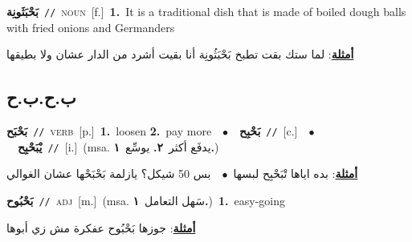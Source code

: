 \documentclass[10pt,a4paper,twoside]{article} %
\begin{document}
\begin{multicols}{2}
{\setlength\topsep{0pt}\textbf{\foreignlanguage{arabic}{بَحْبَثَونِة}}\ {\color{gray}\texttt{//}\color{black}}\ \textsc{noun}\ [f.]\ \textbf{1.}~It is a traditional dish that is made of boiled dough balls with fried onions and Germanders\  \begin{flushright}\color{gray}\foreignlanguage{arabic}{\textbf{\underline{\foreignlanguage{arabic}{أمثلة}}}: لما ستك بقت تطبخ بَحْبَثُونِة أنا بقيت أشرد من الدار عشان ولا بطيقها}\end{flushright}\color{black}} \vspace{2mm}

\vspace{-3mm}
\subsection*{\color{blue}\foreignlanguage{arabic}{ب.ح.ب.ح}\color{blue}{}} 

{\setlength\topsep{0pt}\textbf{\foreignlanguage{arabic}{بَحْبَح}}\ {\color{gray}\texttt{//}\color{black}}\ \textsc{verb}\ [p.]\ \textbf{1.}~loosen  \textbf{2.}~pay more\ \ $\bullet$\ \ \setlength\topsep{0pt}\textbf{\foreignlanguage{arabic}{بَحْبِح}}\ {\color{gray}\texttt{//}\color{black}}\ [c.]\ \ $\bullet$\ \ \setlength\topsep{0pt}\textbf{\foreignlanguage{arabic}{يْبَحْبِح}}\ {\color{gray}\texttt{//}\color{black}}\ [i.]\ \color{gray}(msa. \foreignlanguage{arabic}{يدفَع أكثر}~\foreignlanguage{arabic}{\textbf{٢.}}  \foreignlanguage{arabic}{يوسِّع}~\foreignlanguage{arabic}{\textbf{١.}})\color{black}\  \begin{flushright}\color{gray}\foreignlanguage{arabic}{\textbf{\underline{\foreignlanguage{arabic}{أمثلة}}}: بده اياها تْبَحْبِح لبسها\ $\bullet$\ \  بس 50 شيكل؟ يازلمة بَحْبَحْها عشان الغوالي}\end{flushright}\color{black}} \vspace{2mm}

{\setlength\topsep{0pt}\textbf{\foreignlanguage{arabic}{بَحْبُوح}}\ {\color{gray}\texttt{//}\color{black}}\ \textsc{adj}\ [m.]\ \color{gray}(msa. \foreignlanguage{arabic}{سَهل التعامل}~\foreignlanguage{arabic}{\textbf{١.}})\color{black}\ \textbf{1.}~easy-going\  \begin{flushright}\color{gray}\foreignlanguage{arabic}{\textbf{\underline{\foreignlanguage{arabic}{أمثلة}}}: جوزها بَحْبُوح عفكرة مش زي أبوها}\end{flushright}\color{black}} \vspace{2mm}


\end{multicols}
\end{document}
